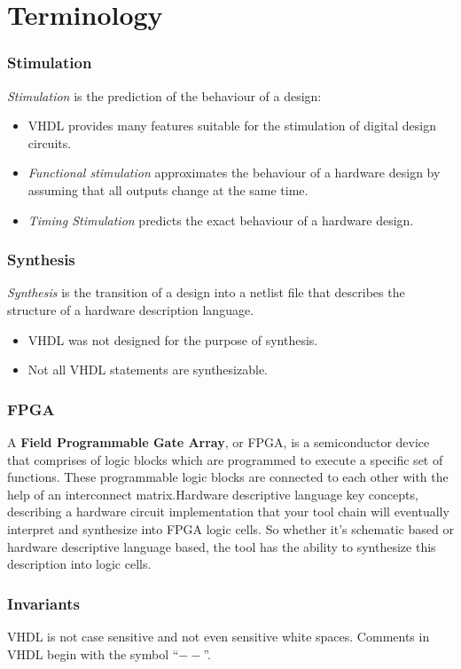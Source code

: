 \documentclass{report}
\begin{document}
\section{Terminology}
\subsubsection{Stimulation}
\textit{Stimulation} is the prediction of the behaviour of a design:
\begin{itemize}
    \item VHDL provides many features suitable for the stimulation of digital design circuits.
    \item \textit{Functional stimulation} approximates the behaviour of a hardware design by assuming that all outputs change at the same time.
    \item \textit{Timing Stimulation} predicts the exact behaviour of a hardware design. 
\end{itemize}
\subsubsection{Synthesis}
\textit{Synthesis} is the transition of a design into a netlist file that describes the structure of a hardware description language.
\begin{itemize}
    \item VHDL was not designed for the purpose of synthesis.
    \item Not all VHDL statements are synthesizable. 
\end{itemize}
\subsubsection{FPGA}
A \textbf{Field Programmable Gate Array}, or FPGA, is a semiconductor device that comprises of logic blocks which are programmed to execute a specific set of functions. These programmable logic blocks are connected to each other with the help of an interconnect matrix.Hardware descriptive language key concepts, describing a hardware circuit implementation that your tool chain will eventually interpret and synthesize into FPGA logic cells. So whether it’s schematic based or hardware descriptive language based, the tool has the ability to synthesize this description into logic cells. 
\subsubsection{Invariants}
VHDL is not case sensitive and not even sensitive white spaces. Comments in VHDL begin with the symbol “$--$”. 
\end{document}
